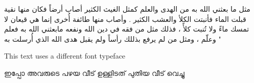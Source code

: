 \begin{Arabic}
	
مثل ما بعثني الله به من الهدى والعلم كمثل الغيث الكثير أصاب أرضاً فكان منها نقية قبلت الماء فأنبتت الكلأ والعشب الكثير . وأصاب منها طائفة أُخرى إنما هي قيعان لا تمسك ماءً ولا تُنبت كلأً ، فذلك مثل من  فقه في دين الله ونفعه مابعثني الله به فعلم وعلّم ، ومثل من لم يرفع بذللك رأساً ولم يقبل هدى الله الذي أُرسلت به " 
	
\end{Arabic}





{\selectfont
	This text uses a different font typeface
}



\begin{malayalam}
	ഇപ്പോ അവരുടെ  പഴയ  വീട് ഉള്ളിടത് പുതിയ വീട് വെച്ചു
\end{malayalam}










